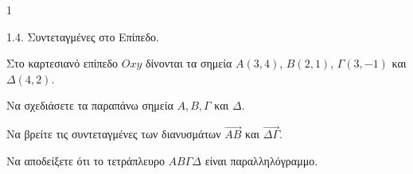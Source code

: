 \begin{ylh}{1}
    \item 1.4. Συντεταγμένες στο Επίπεδο.
\end{ylh}
Στο καρτεσιανό επίπεδο $Oxy$ δίνονται τα σημεία $A(3, 4)$, $B(2, 1)$, $\Gamma(3, -1)$ και $\Delta(4, 2)$.
\begin{alist}
\item Να σχεδιάσετε τα παραπάνω σημεία $A, B, \Gamma$ και $\Delta$.  
\item Να βρείτε τις συντεταγμένες των διανυσμάτων $\overrightarrow{AB}$ και $\overrightarrow{\Delta\Gamma}$.  
\item Να αποδείξετε ότι το τετράπλευρο $AB\Gamma\Delta$ είναι παραλληλόγραμμο.  
\end{alist}